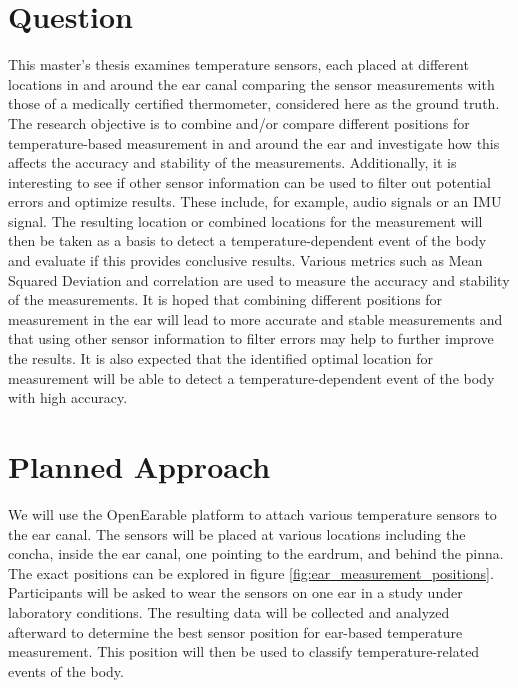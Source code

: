 \section{Question}
This master's thesis examines temperature sensors, each placed at different locations in and around the ear canal comparing the sensor measurements with those of a medically certified thermometer, considered here as the ground truth.
The research objective is to combine and/or compare different positions for temperature-based measurement in and around the ear and investigate how this affects the accuracy and stability of the measurements.
Additionally, it is interesting to see if other sensor information can be used to filter out potential errors and optimize results. These include, for example, audio signals or an IMU signal. The resulting location or combined locations for the measurement will then be taken as a basis to detect a temperature-dependent event of the body and evaluate if this provides conclusive results.
Various metrics such as Mean Squared Deviation and correlation are used to measure the accuracy and stability of the measurements.
It is hoped that combining different positions for measurement in the ear will lead to more accurate and stable measurements and that using other sensor information to filter errors may help to further improve the results. It is also expected that the identified optimal location for measurement will be able to detect a temperature-dependent event of the body with high accuracy.



\section{Planned Approach}
We will use the OpenEarable platform to attach various temperature sensors to the ear canal. 
The sensors will be placed at various locations including the concha, inside the ear canal, one pointing to the eardrum, and behind the pinna.
The exact positions can be explored in figure \ref{fig:ear_measurement_positions}.
Participants will be asked to wear the sensors on one ear in a study under laboratory conditions.
The resulting data will be collected and analyzed afterward to determine the best sensor position for ear-based temperature measurement. 
This position will then be used to classify temperature-related events of the body.


